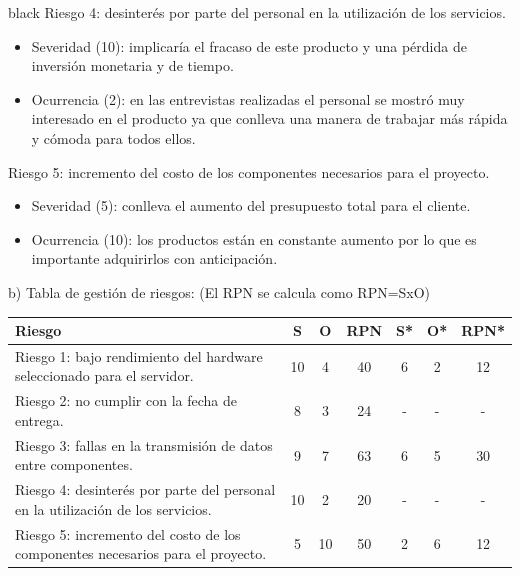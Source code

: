 \documentclass[11pt]{charter}
\begin{document}
\begin{consigna}{black}
Riesgo 4: desinterés por parte del personal en la utilización de los servicios.
\begin{itemize}
\item Severidad (10): implicaría el fracaso de este producto y una pérdida de inversión monetaria y de tiempo.
\item Ocurrencia (2): en las entrevistas realizadas el personal se mostró muy interesado en el producto ya que conlleva una manera de trabajar más rápida y cómoda para todos ellos.
\end{itemize}

Riesgo 5: incremento del costo de los componentes necesarios para el proyecto.
\begin{itemize}
\item Severidad (5): conlleva el aumento del presupuesto total para el cliente.
\item Ocurrencia (10): los productos están en constante aumento por lo que es importante adquirirlos con anticipación.
\end{itemize}


b) Tabla de gestión de riesgos:      (El RPN se calcula como RPN=SxO)
\begin{table}[htpb]
\centering
\begin{tabularx}{\linewidth}{@{}|X|c|c|c|c|c|c|@{}}
\hline
\rowcolor[HTML]{C0C0C0} 
Riesgo & S & O & RPN & S* & O* & RPN* \\ \hline
 Riesgo 1: bajo rendimiento del hardware seleccionado para el servidor. &10   &4   &\cellcolor{red} 40    &6    &2    &\cellcolor{green}12      \\ \hline
 Riesgo 2: no cumplir con la fecha de entrega.  &8   &3   &\cellcolor{green}24     &-    & -   & -     \\ \hline
 Riesgo 3: fallas en la transmisión de datos entre componentes. &9   &7   &\cellcolor{red} 63    &6    &5    &\cellcolor{green}30      \\ \hline
  Riesgo 4: desinterés por parte del personal en la utilización de los servicios.&10   &2   &\cellcolor{green}20     &-    &  -  & -     \\ \hline
   Riesgo 5: incremento del costo de los componentes necesarios para el proyecto. &5   &10   &\cellcolor{red}50     &2    &6    &\cellcolor{green}12      \\ \hline
\end{tabularx}
\end{table}

\end{consigna}
\end{document}
